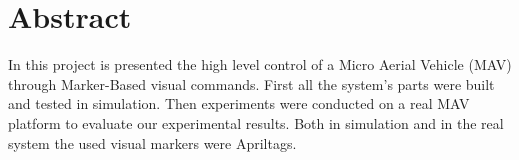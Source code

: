 \chapter*{Abstract}


In this project is presented the high level control of a Micro Aerial Vehicle (MAV) through Marker-Based visual commands. First all the system's parts were built and tested in simulation. Then experiments were conducted on a real MAV platform to evaluate our experimental results. Both in simulation and in the real system the used visual markers were Apriltags\cite{olson2011tags}. 